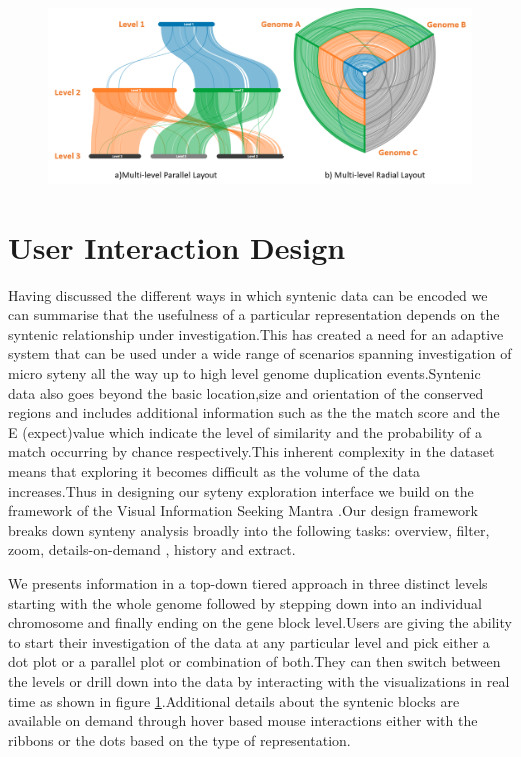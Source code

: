 \begin{figure}
  \centering
  \includegraphics[width=.95\linewidth]{images/ch_4_layout_multi.PNG}
  \label{fig:ch_4_layout_multi}
\end{figure}

\section{User Interaction Design}

Having discussed the different ways in which syntenic data can be encoded we can summarise that the usefulness of a particular representation depends on the syntenic relationship under investigation.This has created a need for an adaptive system that can be used under a wide range of scenarios spanning investigation of micro syteny all the way up to high level genome duplication events.Syntenic data also goes beyond the basic location,size and orientation of the conserved regions and includes additional information such as the the match score and the E (expect)value which indicate the level of similarity and the probability of a match occurring by chance respectively.This inherent complexity in the dataset means that exploring it becomes difficult as the volume of the data increases.Thus in designing our syteny exploration interface we build on the framework of the Visual Information Seeking Mantra \cite{Shneiderman96theeyes}.Our design framework breaks down synteny analysis broadly into the following tasks: overview, filter, zoom, details-on-demand , history and extract.

We presents information in a top-down tiered approach in three distinct levels starting with the whole genome followed by stepping down into an individual chromosome and finally ending on the gene block level.Users are giving the ability to start their investigation of the data at any particular level and pick either a dot plot or a parallel plot or combination of both.They can then switch between the levels or drill down into the data by interacting with the visualizations in real time as shown in figure \ref{fig:ch_4_layout_multi}.Additional details about the syntenic blocks are available on demand through hover based mouse interactions either with the ribbons or the dots based on the type of representation.

